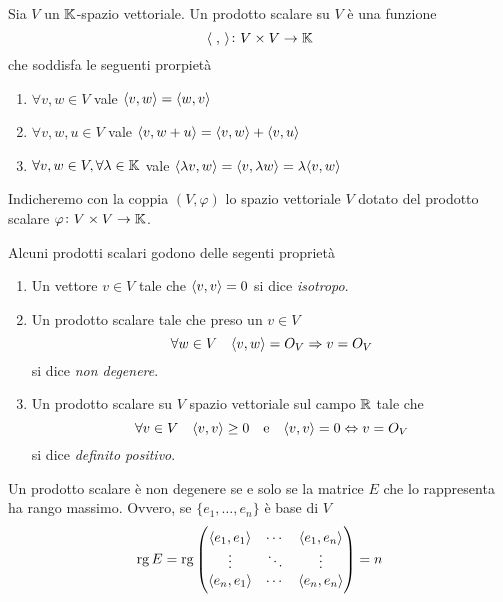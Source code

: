 
\begin{definition}
	Sia $ V $ un $ \mathbb{K} $-spazio vettoriale. Un prodotto scalare su $ V $ è una funzione \[\langle \;, \, \rangle \colon V \times V \to \mathbb{K} \] che soddisfa le seguenti prorpietà
	\begin{enumerate}[label=(\roman*)]
		\item $ \forall v,w \in V $ vale $ \langle v, w \rangle = \langle w, v \rangle $
		\item $ \forall v, w, u \in V $ vale $ \langle v, w + u \rangle = \langle v, w \rangle + \langle v, u \rangle $
		\item $ \forall v, w \in V, \forall \lambda \in \mathbb{K} $ vale $ \langle \lambda v, w \rangle = \langle v, \lambda w \rangle = \lambda \langle v, w \rangle $
	\end{enumerate}	
	Indicheremo con la coppia $ (V, \varphi) $ lo spazio vettoriale $ V $ dotato del prodotto scalare $ \varphi \colon V \times V \to \mathbb{K} $. 
\end{definition}

\begin{propriety} Alcuni prodotti scalari godono delle segenti proprietà
	\begin{enumerate}
		\item Un vettore $ v \in V $ tale che $ \langle v, v \rangle = 0 $ si dice \emph{isotropo}.
		\item Un prodotto scalare tale che preso un $ v \in V $ \[\forall w \in V \quad \langle v, w \rangle = O_V \Rightarrow v = O_V\] si dice \emph{non degenere}.
		\item Un prodotto scalare su $ V $ spazio vettoriale sul campo $ \mathbb{R} $ tale che \[ \forall v \in V \quad \langle v, v \rangle \geq 0 \quad \mathrm{e} \quad \langle v, v \rangle = 0 \Leftrightarrow v = O_V \] si dice \emph{definito positivo}.
	\end{enumerate}
\end{propriety}

\begin{thm}
	Un prodotto scalare è non degenere se e solo se la matrice $ E $ che lo rappresenta ha rango massimo. Ovvero, se $ \{e_1, \ldots, e_n \} $ è base di $ V $
	\[ \operatorname{rg}{E} = \operatorname{rg}{ 
		\begin{pmatrix}
		\langle e_1, e_1 \rangle & \cdots  & \langle e_1, e_n \rangle \\
		\vdots           & \ddots & \vdots \\
		\langle e_n, e_1 \rangle & \cdots  & \langle e_n, e_n \rangle \\
		\end{pmatrix}}
	= n	\]
\end{thm}

